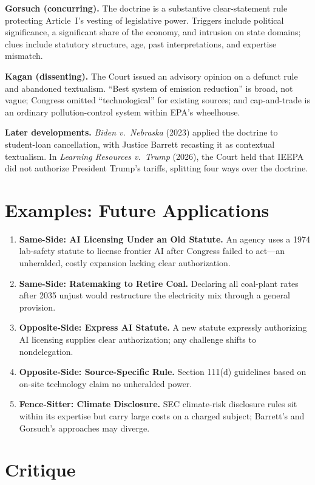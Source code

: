 \documentclass[12pt]{article}
\begin{document}
\textbf{Gorsuch (concurring).} The doctrine is a substantive clear-statement rule protecting Article~I's vesting of legislative power. Triggers include political significance, a significant share of the economy, and intrusion on state domains; clues include statutory structure, age, past interpretations, and expertise mismatch.

\textbf{Kagan (dissenting).} The Court issued an advisory opinion on a defunct rule and abandoned textualism. ``Best system of emission reduction'' is broad, not vague; Congress omitted ``technological'' for existing sources; and cap-and-trade is an ordinary pollution-control system within EPA's wheelhouse.

\textbf{Later developments.} \textit{Biden v.\ Nebraska} (2023) applied the doctrine to student-loan cancellation, with Justice Barrett recasting it as contextual textualism. In \textit{Learning Resources v.\ Trump} (2026), the Court held that IEEPA did not authorize President Trump's tariffs, splitting four ways over the doctrine.

\section{Examples: Future Applications}

\begin{enumerate}
\item \textbf{Same-Side: AI Licensing Under an Old Statute.} An agency uses a 1974 lab-safety statute to license frontier AI after Congress failed to act---an unheralded, costly expansion lacking clear authorization.
\item \textbf{Same-Side: Ratemaking to Retire Coal.} Declaring all coal-plant rates after 2035 unjust would restructure the electricity mix through a general provision.
\item \textbf{Opposite-Side: Express AI Statute.} A new statute expressly authorizing AI licensing supplies clear authorization; any challenge shifts to nondelegation.
\item \textbf{Opposite-Side: Source-Specific Rule.} Section 111(d) guidelines based on on-site technology claim no unheralded power.
\item \textbf{Fence-Sitter: Climate Disclosure.} SEC climate-risk disclosure rules sit within its expertise but carry large costs on a charged subject; Barrett's and Gorsuch's approaches may diverge.
\end{enumerate}

\section{Critique}
\end{document}
